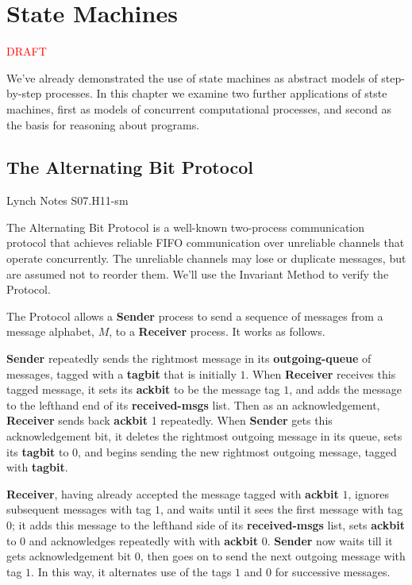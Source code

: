 
\chapter{State Machines}\label{chap:state-machines}

\begin{center}
{\large \textcolor{red}{DRAFT}}
\end{center}

We've already demonstrated the use of state machines as abstract
models of step-by-step processes.  In this chapter we examine two
further applications of stste machines, first as models of concurrent
computational processes, and second as the basis for reasoning about
programs.

\section{The Alternating Bit Protocol}

\begin{editingnotes}
Lynch Notes S07.H11-sm
\end{editingnotes}

The Alternating Bit Protocol is a well-known two-process communication
protocol that achieves reliable FIFO communication over unreliable
channels that operate concurrently.  The unreliable channels may lose
or duplicate messages, but are assumed not to reorder them.  We'll use
the Invariant Method to verify the Protocol.

The Protocol allows a \textbf{Sender} process to send a sequence of
messages from a message alphabet, $M$, to a \textbf{Receiver}
process. It works as follows.

\textbf{Sender} repeatedly sends the rightmost message in its
\textbf{outgoing-queue} of messages, tagged with a \textbf{tagbit}
that is initially $1$.  When \textbf{Receiver} receives this tagged
message, it sets its \textbf{ackbit} to be the message tag $1$, and
adds the message to the lefthand end of its \textbf{received-msgs}
list.  Then as an acknowledgement, \textbf{Receiver} sends back
\textbf{ackbit} 1 repeatedly.  When \textbf{Sender} gets this
acknowledgement bit, it deletes the rightmost outgoing message in its
queue, sets its \textbf{tagbit} to 0, and begins sending the new
rightmost outgoing message, tagged with \textbf{tagbit}.

\textbf{Receiver}, having already accepted the message tagged with
\textbf{ackbit} $1$, ignores subsequent messages with tag $1$, and
waits until it sees the first message with tag $0$; it adds this
message to the lefthand side of its \textbf{received-msgs} list, sets
\textbf{ackbit} to 0 and acknowledges repeatedly with with
\textbf{ackbit} $0$.  \textbf{Sender} now waits till it gets
acknowledgement bit $0$, then goes on to send the next outgoing
message with tag $1$.  In this way, it alternates use of the tags $1$
and $0$ for successive messages.

